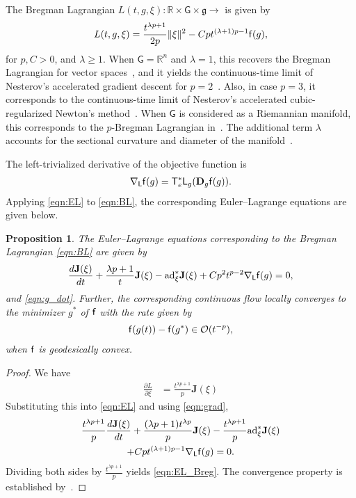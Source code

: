 \documentclass[letterpaper, 10pt, conference]{ieeeconf}
\newcommand{\deriv}[2]{\ensuremath{\frac{\partial #1}{\partial #2}}}
\newcommand{\G}{\ensuremath{\mathsf{G}}}
\newcommand{\T}{\ensuremath{\mathsf{T}}}
\renewcommand{\L}{\ensuremath{\mathsf{L}}}
\renewcommand{\Re}{\ensuremath{\mathbb{R}}}
\newcommand{\D}{\ensuremath{\mathbf{D}}}
\newcommand{\ad}{\ensuremath{\mathrm{ad}}}
\newcommand{\g}{\ensuremath{\mathfrak{g}}}
\newtheorem{prop}{Proposition}
\begin{document}
The Bregman Lagrangian $L(t,g,\xi):\Re\times\G\times\g\rightarrow$ is given by
\begin{align}
    L(t,g,\xi) = \frac{t^{\lambda p+1}}{2p} \|\xi\|^2 - C p t^{(\lambda+1)p-1} \mathsf{f} (g),\label{eqn:BL}
\end{align}
for $p, C>0$, and $\lambda\geq 1$.
When $\G=\Re^n$ and $\lambda=1$, this recovers the Bregman Lagrangian for vector spaces~\cite{wibisono2016variational}, and it yields the continuous-time limit of Nesterov's accelerated gradient descent for $p=2$~\cite{nesterov2005smooth}.
Also, in case $p = 3$, it corresponds to the continuous-time limit of Nesterov’s accelerated cubic-regularized Newton’s method~\cite{nesterov2008accelerating}.
When $\G$ is considered as a Riemannian manifold, this corresponds to the $p$-Bregman Lagrangian in~\cite{duruisseaux2021variational}.
The additional term $\lambda$ accounts for the sectional curvature and diameter of the manifold~\cite{alimisis2020continuous}. 

The left-trivialized derivative of the objective function is
\begin{align}
    \nabla_\L \obj(g) = \T_e^*\L_g (\D_g \obj(g)).\label{eqn:grad}
\end{align}
Applying \eqref{eqn:EL} to \eqref{eqn:BL}, the corresponding Euler--Lagrange equations are given below.
\begin{prop}\label{prop:EL_Breg}
    The Euler--Lagrange equations corresponding to the Bregman Lagrangian \eqref{eqn:BL} are given by
    \begin{align}
        \frac{d \mathbf{J}(\xi)}{dt} + \frac{\lambda p+1}{t}\mathbf{J}(\xi) - \ad^*_\xi \mathbf{J}(\xi)
        + Cp^2 t^{p-2} \nabla_\L \obj (g) =0, \label{eqn:EL_Breg}
    \end{align}
    and \eqref{eqn:g_dot}. 
    Further, the corresponding continuous flow locally converges to the minimizer $g^*$ of $\mathsf{f}$ with the rate given by
    \begin{align}
        \mathsf{f}(g(t)) - \mathsf{f}(g^*) \in \mathcal{O}(t^{-p}),
    \end{align}
    when $\mathsf{f}$ is geodesically convex. 
\end{prop}
\begin{proof}
    We have
    \begin{align*}
        \deriv{L}{\xi} & = \frac{t^{\lambda p+1}}{p}\mathbf{J}(\xi)
    \end{align*}
    Substituting this into \eqref{eqn:EL} and using \eqref{eqn:grad}, 
    \begin{gather*}
        \frac{t^{\lambda p+1}}{p}\frac{d \mathbf{J}(\xi)}{dt} + \frac{(\lambda p+1)t^{\lambda p}}{p}\mathbf{J}(\xi) -\frac{t^{\lambda p+1}}{p} \ad^*_\xi \mathbf{J}(\xi) \\
        + Cpt^{(\lambda +1)p-1} \nabla_\L \obj(g) =0.
    \end{gather*}
    Dividing both sides by $\frac{t^{\lambda p+1}}{p}$ yields \eqref{eqn:EL_Breg}.
    The convergence property is established by~\cite[Theorem 3.2]{duruisseaux2021variational}.
\end{proof}
\end{document}
